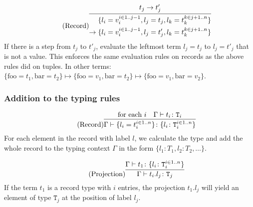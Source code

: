 \begin{equation*}
    \tag{Record}
    \infer{
        \begin{split}
            \{l_i = v_i^{i \in 1..j-1}, l_j = t_j, l_k = t_k^{k \in j+1..n}\} \\
            \rightarrow \{l_i = v_i^{i \in 1..j-1}, l_j = t'_j, l_k = t_k^{k \in j+1..n}\}
        \end{split}
    }{
        t_j \rightarrow t'_j
    }
\end{equation*}
If there is a step from $t_j$ to $t'_j$, evaluate the leftmost
term $l_j = t_j$ to $l_j = t'_j$ that is not a value. This enforces
the same evaluation rules on records as the above rules did on tuples.
In other terms:
$\{\text{foo}=t_1, \text{bar}=t_2\} \mapsto \{\text{foo}=v_1, \text{bar}=t_2\} \mapsto \{\text{foo}=v_1, \text{bar}=v_2\}$.

\subsubsection{Addition to the typing rules \cite{pierce2002ProgLang}}
\begin{equation*}
    \tag{Record}
    \infer{
    \Gamma \vdash \{l_i = t_i^{i \in 1..n}\} \colon \{l_i \colon \texttt{T}_i^{i \in 1..n}\}
    }{
    \text{for each } i & \Gamma \vdash t_i \colon \texttt{T}_i
    }
\end{equation*}
For each element in the record with label $l$, we calculate the type
and add the whole record to the typing context $\Gamma$ in the form
$\{l_1 \colon T_1, l_2 \colon T_2, \dots\}$.

\begin{equation*}
    \tag{Projection}
    \infer{
    \Gamma \vdash t_i . l_j \colon \texttt{T}_j
    }{
    \Gamma \vdash t_1 \colon \{l_i \colon \texttt{T}_i^{i \in 1..n}\}
    }
\end{equation*}
If the term $t_1$ is a record type with $i$ entries, the projection
$t_1 . l_j$ will yield an element of type $\texttt{T}_j$ at
the position of label $l_j$.
